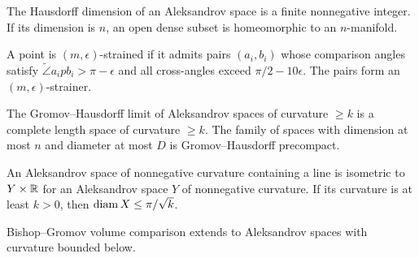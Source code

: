 \begin{theorem}
\label{thm:chow-iii-g40-g42-regularity}
The Hausdorff dimension of an Aleksandrov space is a finite nonnegative integer.
If its dimension is $n$, an open dense subset is homeomorphic to an
$n$-manifold.
\end{theorem}

\begin{definition}[Strainers]
\label{def:chow-iii-g41-strainers}
A point is $(m,\epsilon)$-strained if it admits pairs $(a_i,b_i)$ whose
comparison angles satisfy
$\widetilde\angle a_ipb_i>\pi-\epsilon$ and all cross-angles exceed
$\pi/2-10\epsilon$.  The pairs form an $(m,\epsilon)$-strainer.
\end{definition}

\begin{theorem}
\label{thm:chow-iii-g43-g44-compactness}
The Gromov--Hausdorff limit of Aleksandrov spaces of curvature $\geq k$ is a
complete length space of curvature $\geq k$.  The family of spaces with
dimension at most $n$ and diameter at most $D$ is Gromov--Hausdorff precompact.
\end{theorem}

\begin{theorem}
\label{thm:chow-iii-g45-g46-splitting-diameter}
An Aleksandrov space of nonnegative curvature containing a line is isometric to
$Y\times\mathbb R$ for an Aleksandrov space $Y$ of nonnegative curvature.  If its
curvature is at least $k>0$, then $\operatorname{diam} X\leq\pi/\sqrt{k}$.
\end{theorem}

\begin{remark}
\label{rem:chow-iii-g47-volume-comparison}
Bishop--Gromov volume comparison extends to Aleksandrov spaces with curvature
bounded below.
\end{remark}


